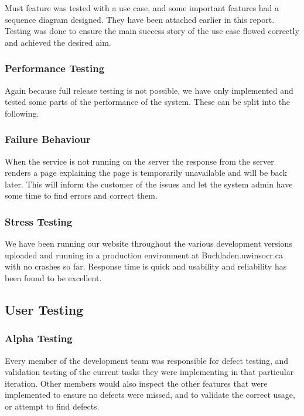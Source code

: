 \documentclass[11pt]{article}
\begin{document}
			Must feature was tested with a use case, and some important features had a sequence diagram designed. 
			They have been attached earlier in this report. 
			Testing was done to ensure the main success story of the use case flowed correctly and achieved the desired aim.

		\subsubsection{Performance Testing}

			Again because full release testing is not possible, we have only implemented and tested some parts of the performance of the system. 
			These can be split into the following.

		\subsubsection{Failure Behaviour}

			When the service is not running on the server the response from the server renders a page explaining the page is temporarily unavailable and will be back later. 
			This will inform the customer of the issues and let the system admin have some time to find errors and correct them.

		\subsubsection{Stress Testing}

			We have been running our website throughout the various development versions uploaded and running in a production environment at Buchladen.uwinsocr.ca with no crashes so far. 
			Response time is quick and usability and reliability has been found to be excellent. 

	\subsection{User Testing}

		\subsubsection{Alpha Testing}

			Every member of the development team was responsible for defect testing, and validation testing of the current tasks they were implementing in that particular iteration. 
			Other members would also inspect the other features that were implemented to ensure no defects were missed, and to validate the correct usage, or attempt to find defects.
\end{document}
